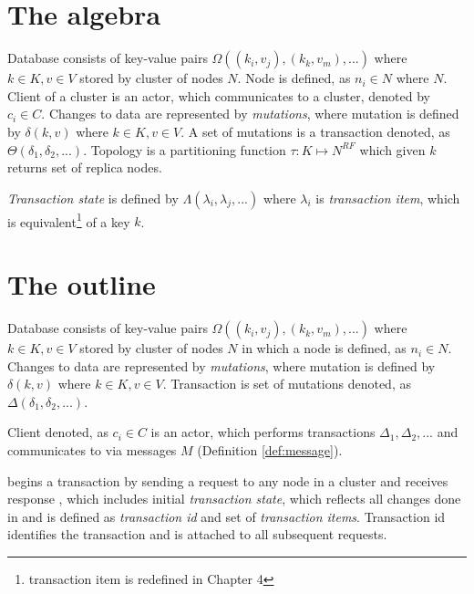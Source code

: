 
\section{The algebra}
Database consists of key-value pairs $\Omega((k_{i},v_{j}), (k_{k},v_{m}),...)$ where $k\in\mathit{K}, v\in\mathit{V}$ stored by cluster of nodes $\mathit{N}$. Node is defined, as $n_{i}\in\mathit{N}$ where $\mathit{N}$. Client of a cluster is an actor, which communicates to a cluster, denoted by $c_{i}\in\mathit{C}$. Changes to data are represented by \emph{mutations}, where mutation is defined by $\delta(k,v)$ where $k \in \mathit{K}, v \in \mathit{V}$.
A set of mutations is a transaction denoted, as $\Theta(\delta_{1}, \delta_{2}, ...)$. Topology is a partitioning function $\tau:\mathit{K} \mapsto \mathit{N^{RF}}$ which given $k$ returns set of replica nodes. 

\emph{Transaction state} is defined by $\Lambda(\lambda_{i}, \lambda_{j}, ...)$ where $\lambda_{i}$ is \emph{transaction item}, which is equivalent\footnote{transaction item is redefined in Chapter 4} of a key $k$.

\section{The outline}
Database consists of key-value pairs $\Omega((k_{i},v_{j}), (k_{k},v_{m}),...)$ where $k\in\mathit{K}, v\in\mathit{V}$ stored by cluster of nodes $\mathit{N}$ in which a node is defined, as $n_{i}\in\mathit{N}$.
Changes to data are represented by \emph{mutations}, where mutation is defined by $\delta(k,v)$ where $k \in \mathit{K}, v \in \mathit{V}$. Transaction is set of mutations denoted, as $\Delta(\delta_{1}, \delta_{2}, ...)$.

Client denoted, as $c_{i}\in\mathit{C}$ is an actor, which performs transactions $\Delta_{1}, \Delta_{2}, ...$ and communicates to \nodes via messages $\mathit{M}$ (Definition \ref{def:message}).


 \client begins a transaction \transaction by sending a request to any node in a cluster  and receives response , which includes 
initial \emph{transaction state}, which reflects all changes done in \transaction and is defined as \emph{transaction id} and set of \emph{transaction items}. Transaction id identifies the transaction and is attached to all subsequent requests. 

